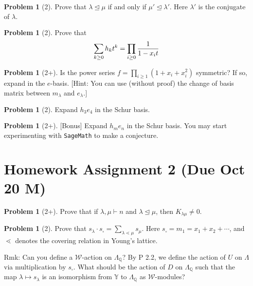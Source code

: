 \documentclass{amsart}
\theoremstyle{plain}
\theoremstyle{definition}
\newtheorem{problem}[theorem]{Problem}
\begin{document}
	\begin{problem}[2]
		Prove that $\lambda\trianglelefteq \mu$ if and only if $\mu'\trianglelefteq \lambda'$. Here $\lambda'$ is the conjugate of $\lambda$.
	\end{problem}
	
	\begin{problem}[2]
		Prove that
		\[\sum_{k\geq 0} h_k t^k = \prod_{i\geq0}{1\over 1-x_it}\]
	\end{problem}
	
	\begin{problem}[2+]
		Is the power series $f=\prod_{i\geq 1}(1+x_i+x_i^2)$ symmetric? If so, expand in the $e$-basis. [Hint: You can use (without proof) the change of basis matrix between $m_\lambda$ and $e_\lambda$.]
	\end{problem}
		\begin{problem}[2]
		Expand $h_3e_4$ in the Schur basis. 	
	\end{problem}
	\begin{problem}[2+]
		[Bonus] Expand $h_me_n$ in the Schur basis. You may start experimenting with {\tt{SageMath}} to make a conjecture.
	\end{problem}
	
	
	\section{Homework Assignment 2 (Due Oct 20 M)}
	\begin{problem}[2+] 		Prove that if $\lambda,\mu\vdash n$ and $\lambda\trianglelefteq \mu$, then $K_{\lambda\mu}\neq 0$.
	\end{problem}
\begin{problem}[2]
	Prove that $s_\lambda\cdot s_{\square}=\sum_{\lambda \lessdot \mu}{s_\mu}$. Here $s_{\square}=m_1=x_1+x_2+\cdots$, and $\lessdot$ denotes the covering relation in Young's lattice.
\end{problem}

{\color{blue}Rmk: Can you define a $\mathcal{W}$-action on $\Lambda_{\mathbb{Q}}$? By P 2.2, we define the action of $U$ on $\Lambda$ via multiplication by $s_{\square}$. What should be the action of $D$ on $\Lambda_{\mathbb{Q}}$ such that the map $ \lambda \mapsto s_\lambda$ is an isomorphism from $\mathbb{Y}$ to $\Lambda_{\mathbb{Q}}$ as $\mathcal{W}$-modules?}
\end{document}
